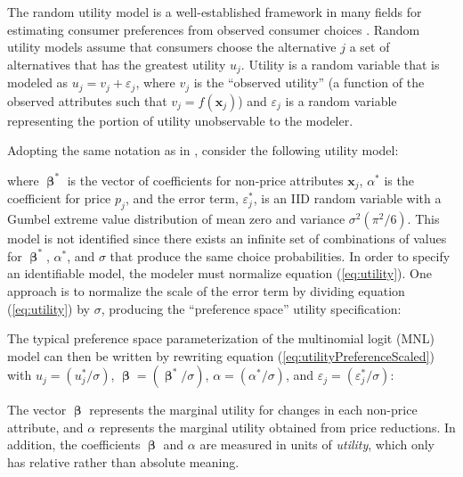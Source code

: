 \documentclass[article]{jss}
\begin{document}
The random utility model is a well-established framework in many fields
for estimating consumer preferences from observed consumer choices
\citep[\citet{Train2009}]{Louviere2000}. Random utility models assume
that consumers choose the alternative \(j\) a set of alternatives that
has the greatest utility \(u_{j}\). Utility is a random variable that is
modeled as \(u_{j} = v_{j} + \varepsilon_{j}\), where \(v_{j}\) is the
``observed utility'' (a function of the observed attributes such that
\(v_{j} = f(\mathrm{\mathbf{x}}_{j})\)) and \(\varepsilon_{j}\) is a
random variable representing the portion of utility unobservable to the
modeler.

Adopting the same notation as in \citep{Helveston2018}, consider the
following utility model:



where \(\boldsymbol\upbeta^{*}\) is the vector of coefficients for
non-price attributes \(\mathrm{\mathbf{x}}_{j}\), \(\alpha^{*}\) is the
coefficient for price \(p_{j}\), and the error term,
\(\varepsilon^{*}_{j}\), is an IID random variable with a Gumbel extreme
value distribution of mean zero and variance \(\sigma^2(\pi^2/6)\). This
model is not identified since there exists an infinite set of
combinations of values for \(\boldsymbol\upbeta^{*}\), \(\alpha^{*}\),
and \(\sigma\) that produce the same choice probabilities. In order to
specify an identifiable model, the modeler must normalize equation
(\ref{eq:utility}). One approach is to normalize the scale of the error
term by dividing equation (\ref{eq:utility}) by \(\sigma\), producing
the ``preference space'' utility specification:



The typical preference space parameterization of the multinomial logit
(MNL) model can then be written by rewriting equation
(\ref{eq:utilityPreferenceScaled}) with \(u_j = (u^*_j / \sigma)\),
\(\boldsymbol\upbeta= (\boldsymbol\upbeta^{*} / \sigma)\),
\(\alpha = (\alpha^{*} / \sigma)\), and
\(\varepsilon_{j} = (\varepsilon^{*}_{j} / \sigma)\):



The vector \(\boldsymbol\upbeta\) represents the marginal utility for
changes in each non-price attribute, and \(\alpha\) represents the
marginal utility obtained from price reductions. In addition, the
coefficients \(\boldsymbol\upbeta\) and \(\alpha\) are measured in units
of \emph{utility}, which only has relative rather than absolute meaning.
\end{document}
